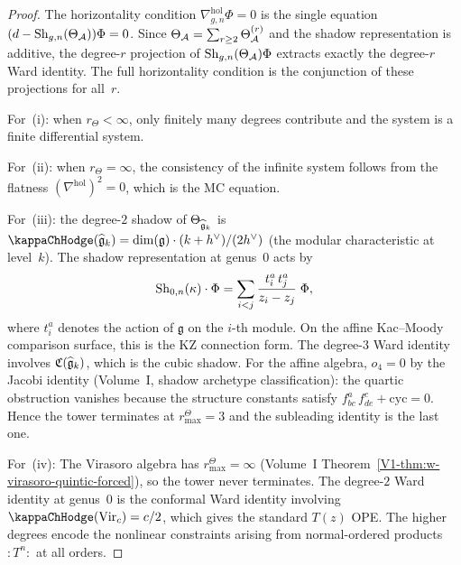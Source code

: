 \begin{proof}
The horizontality condition $\nabla^{\mathrm{hol}}_{g,n}\Phi = 0$
is the single equation $(d - \operatorname{Sh}_{g,n}(\Theta_{\mathcal{A}}))\Phi = 0$.
Since $\Theta_{\mathcal{A}} = \sum_{r \geq 2} \Theta_{\mathcal{A}}^{(r)}$ and the
shadow representation is additive, the degree-$r$ projection of
$\operatorname{Sh}_{g,n}(\Theta_{\mathcal{A}})\Phi$ extracts exactly the degree-$r$ Ward
identity. The full horizontality condition is the conjunction of
these projections for all~$r$.

For~(i): when \(r_\Theta<\infty\), only finitely many degrees
contribute and the system is a finite differential system.

For~(ii): when \(r_\Theta=\infty\), the consistency of the
infinite system follows from the flatness
$(\nabla^{\mathrm{hol}})^2 = 0$, which is the MC equation.

For~(iii): the degree-$2$ shadow of $\Theta_{\widehat{\mathfrak{g}}_k}$ is
$\kappaChHodge(\widehat{\fg}_k) = \dim(\fg)\cdot(k+h^\vee)/(2h^\vee)$ (the modular characteristic at
level~$k$). The shadow representation at genus~$0$ acts by
\begin{equation}%
\Sh_{0,n}(\kappa) \cdot \Phi
= \sum_{i < j} \frac{t^a_i\,t^a_j}{z_i - z_j}\;\Phi,
\end{equation}
where $t^a_i$ denotes the action of $\mathfrak{g}$ on the
$i$-th module. On the affine Kac--Moody comparison surface, this
is the KZ connection form. The degree-$3$
Ward identity involves $\mathfrak{C}(\widehat{\mathfrak{g}}_k)$, which
is the cubic shadow. For the affine algebra, $o_4 = 0$ by the
Jacobi identity
(Volume~I, shadow archetype classification): the quartic obstruction
vanishes because the structure constants satisfy
$f^a_{bc}\,f^c_{de} + \text{cyc} = 0$. Hence the tower terminates
at \(r^\Theta_{\max}=3\) and the subleading identity is the last one.

For~(iv): The Virasoro algebra has \(r^\Theta_{\max}=\infty\)
(Volume~I Theorem~\ref{V1-thm:w-virasoro-quintic-forced}), so the tower
never terminates. The degree-$2$ Ward identity at genus~$0$
is the conformal Ward identity involving
$\kappaChHodge(\mathrm{Vir}_c) = c/2$,
which gives the standard $T(z)$ OPE. The higher degrees encode the
nonlinear constraints arising from normal-ordered products
$:T^n:$ at all orders.
\end{proof}


